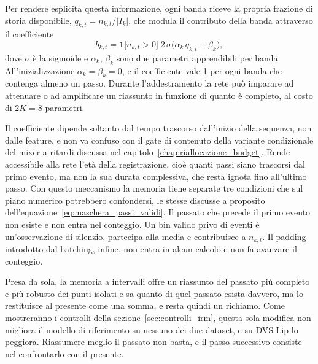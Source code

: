 Per rendere esplicita questa informazione, ogni banda riceve la propria frazione di storia disponibile, $q_{k,t}=n_{k,t}/|I_k|$, che modula il contributo della banda attraverso il coefficiente
\begin{equation}
\label{eq:gate_disponibilita}
b_{k,t}=\mathbf 1\bigl[n_{k,t}>0\bigr]\;2\,\sigma\bigl(\alpha_k\,q_{k,t}+\beta_k\bigr),
\end{equation}
dove $\sigma$ è la sigmoide e $\alpha_k$, $\beta_k$ sono due parametri apprendibili per banda. All'inizializzazione $\alpha_k=\beta_k=0$, e il coefficiente vale 1 per ogni banda che contenga almeno un passo. Durante l'addestramento la rete può imparare ad attenuare o ad amplificare un riassunto in funzione di quanto è completo, al costo di $2K=8$ parametri.

Il coefficiente dipende soltanto dal tempo trascorso dall'inizio della sequenza, non dalle feature, e non va confuso con il gate di contenuto della variante condizionale del mixer a ritardi discussa nel capitolo~\ref{chap:riallocazione_budget}. Rende accessibile alla rete l'età della registrazione, cioè quanti passi siano trascorsi dal primo evento, ma non la sua durata complessiva, che resta ignota fino all'ultimo passo. Con questo meccanismo la memoria tiene separate tre condizioni che sul piano numerico potrebbero confondersi, le stesse discusse a proposito dell'equazione~\eqref{eq:maschera_passi_validi}. Il passato che precede il primo evento non esiste e non entra nel conteggio. Un bin valido privo di eventi è un'osservazione di silenzio, partecipa alla media e contribuisce a $n_{k,t}$. Il padding introdotto dal batching, infine, non entra in alcun calcolo e non fa avanzare il conteggio.

Presa da sola, la memoria a intervalli offre un riassunto del passato più completo e più robusto dei punti isolati e sa quanto di quel passato esista davvero, ma lo restituisce al presente come una somma, e resta quindi un richiamo. Come mostreranno i controlli della sezione~\ref{sec:controlli_irm}, questa sola modifica non migliora il modello di riferimento su nessuno dei due dataset, e su DVS-Lip lo peggiora. Riassumere meglio il passato non basta, e il passo successivo consiste nel confrontarlo con il presente.

